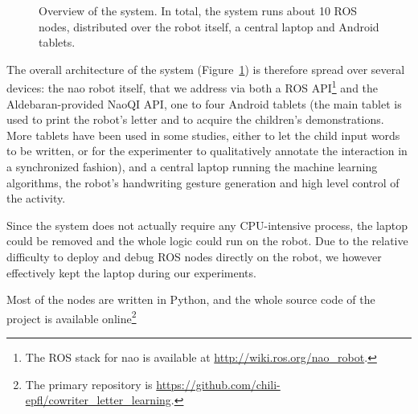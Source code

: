 \documentclass{article}
\begin{document}
\begin{figure}[ht!]
{
}

\caption{\small Overview of the system. In total, the system runs about 10 ROS nodes,
    distributed over the robot itself, a central laptop and Android tablets.}

    \label{fig:archi}
\end{figure}

The overall architecture of the system (Figure~\ref{fig:archi}) is therefore
spread over several devices: the {\sc nao} robot itself, that we address via
both a ROS API\footnote{The ROS stack for {\sc nao} is available at
\url{http://wiki.ros.org/nao_robot}.} and the Aldebaran-provided NaoQI API, one
to four Android tablets (the main tablet is used to print the robot's letter and
to acquire the children's demonstrations. More tablets have been used in some
studies, either to let the child input words to be written, or for the
experimenter to qualitatively annotate the interaction in a synchronized
fashion), and a central laptop running the machine learning algorithms, the
robot's handwriting gesture generation and high level control of the activity.

Since the system does not actually require any CPU-intensive process, the laptop
could be removed and the whole logic could run on the robot. Due to the relative
difficulty to deploy and debug ROS nodes directly on the robot, we however
effectively kept the laptop during our experiments.

Most of the nodes are written in Python, and the whole source code of the
project is available online\footnote{The primary repository is
\url{https://github.com/chili-epfl/cowriter_letter_learning}.}
\end{document}
